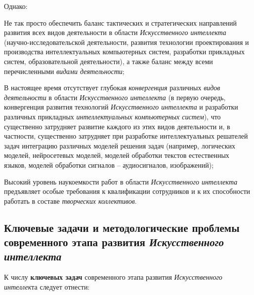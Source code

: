 Однако:
\begin{textitemize}
	\item
	Не так просто обеспечить баланс тактических и стратегических направлений развития всех видов деятельности в области \textit{Искусственного интеллекта} (научно-исследовательской деятельности, развития технологии проектирования и производства интеллектуальных компьютерных систем, разработки прикладных систем, образовательной деятельности), а также баланс между всеми перечисленными \textit{видами деятельности};
	\item
	В настоящее время отсутствует глубокая \textit{конвергенция} различных \textit{видов деятельности} в области \textit{Искусственного интеллекта} (в первую очередь, конвергенция развития технологий \textit{Искусственного интеллекта} и разработки различных прикладных \textit{интеллектуальных компьютерных систем}), что существенно затрудняет развитие каждого из этих видов деятельности и, в частности, существенно затрудняет при разработке интеллектуальных решателей задач интеграцию различных моделей решения задач (например, логических моделей, нейросетевых моделей, моделей обработки текстов естественных языков, моделей обработки сигналов -- аудиосигналов, изображений);
	\item
	Высокий уровень наукоемкости работ в области \textit{Искусственного интеллекта} предъявляет особые требования к квалификации сотрудников и к их способности работать в составе \textit{творческих коллективов}.
\end{textitemize}

\subsection{Ключевые задачи и методологические проблемы современного этапа развития \textbf{\textit{Искусственного интеллекта}}}

К числу \textbf{ключевых задач} современного этапа развития \textit{Искусственного интеллек}та следует отнести:

